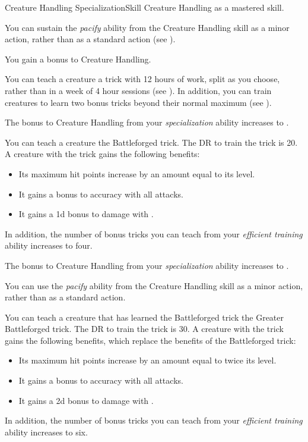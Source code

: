     \begin{feat}{Creature Handling Specialization}{Skill}
        \featpre Creature Handling as a mastered skill.

         You can sustain the \textit{pacify} ability from the Creature Handling skill as a minor action, rather than as a standard action (see ).

         You gain a  bonus to Creature Handling.

         You can teach a creature a trick with 12 hours of work, split as you choose, rather than in a week of 4 hour sessions (see ).
        In addition, you can train creatures to learn two bonus tricks beyond their normal maximum (see ).

         The bonus to Creature Handling from your \textit{specialization} ability increases to .

         You can teach a creature the Battleforged trick.
        The DR to train the trick is 20.
        A creature with the trick gains the following benefits:
        \begin{itemize}
            \item Its maximum hit points increase by an amount equal to its level.
            \item It gains a  bonus to accuracy with all attacks.
            \item It gains a \plus1d bonus to damage with .
        \end{itemize}
        In addition, the number of bonus tricks you can teach from your \textit{efficient training} ability increases to four.

         The bonus to Creature Handling from your \textit{specialization} ability increases to .

         You can use the \textit{pacify} ability from the Creature Handling skill as a minor action, rather than as a standard action.

         You can teach a creature that has learned the Battleforged trick the Greater Battleforged trick.
        The DR to train the trick is 30.
        A creature with the trick gains the following benefits, which replace the benefits of the Battleforged trick:
        \begin{itemize}
            \item Its maximum hit points increase by an amount equal to twice its level.
            \item It gains a  bonus to accuracy with all attacks.
            \item It gains a \plus2d bonus to damage with .
        \end{itemize}
        In addition, the number of bonus tricks you can teach from your \textit{efficient training} ability increases to six.
    \end{feat}

